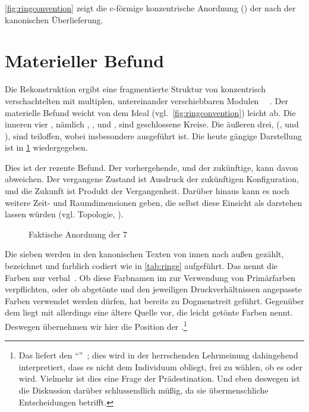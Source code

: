 \cref{fig:ringconvention} zeigt die c-förmige konzentrische Anordnung () der  nach der kanonischen Überlieferung.
        
\section*{Materieller Befund}

Die Rekonstruktion ergibt eine fragmentierte Struktur von konzentrisch verschachtelten  mit multiplen, untereinander verschiebbaren Modulen ~\cite{cbasebook}~\cite{cbasepressemap}. 
Der materielle Befund weicht von dem Ideal (vgl.~\cref{fig:ringconvention}) leicht ab. Die inneren vier , nämlich , ,  und , sind geschlossene Kreise. Die äußeren drei, (,  und ), sind teiloffen, wobei insbesondere   ausgeführt ist. Die heute gängige Darstellung ist in \cref{fig:cbaselogo} wiedergegeben.

Dies ist der rezente Befund. Der vorhergehende, und der zukünftige, kann davon abweichen. Der vergangene Zustand ist Ausdruck der zukünftigen Konfiguration, und die Zukunft ist Produkt der Vergangenheit. Darüber hinaus kann es noch weitere Zeit- und Raumdimensionen geben, die selbst diese Einsicht als  darstehen lassen würden (vgl. Topologie, ).


\begin{figure}[ht!]
    \centering
        \resizebox{0.6\textwidth}{!}{
        
    }
    \caption{Faktische Anordnung der 7 }
    \label{fig:cbaselogo}
\end{figure}


    Die sieben   werden in den kanonischen Texten von innen nach außen gezählt, bezeichnet und  farblich codiert  wie in  \cref{tab:ringe} aufgeführt. Das  nennt die Farben nur verbal~\cite[S.49]{cbasebook}. Ob diese Farbnamen im  zur Verwendung von Primärfarben verpflichten, oder ob abgetönte und den jeweiligen Druckverhältnissen angepasste Farben verwendet werden dürfen, hat bereits zu Dogmenstreit geführt. Gegenüber dem  liegt mit \cite{cbasefarbschema} allerdings eine ältere Quelle vor, die leicht getönte Farben nennt. Deswegen übernehmen wir hier die Position der .\footnote{Das  liefert den  "`"'~\cite[S. 47]{cbasebook}; dies wird in der herrschenden Lehrmeinung dahingehend interpretiert, dass es nicht dem Individuum obliegt, frei zu wählen, ob es  oder  wird. Vielmehr ist dies eine Frage der Prädestination. Und eben deswegen ist die Diskussion darüber schlussendlich müßig, da sie übermenschliche Entscheidungen betrifft.}

